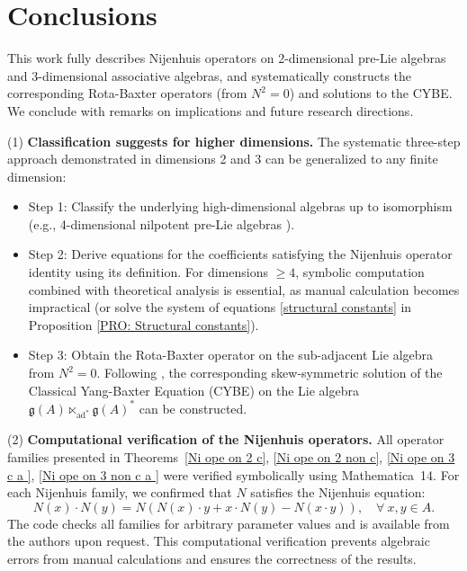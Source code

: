 \documentclass[12pt, reqno]{amsart}
\theoremstyle{plain}
\begin{document}
\section{Conclusions}
This work fully describes Nijenhuis operators on 2-dimensional pre-Lie algebras and 3-dimensional associative algebras, and systematically constructs the corresponding Rota-Baxter operators (from  $N^2=0$) and solutions to the CYBE. We conclude with remarks on implications and future research directions.

(1) \textbf{Classification suggests for higher dimensions.}
The systematic three-step approach demonstrated in dimensions 2 and 3 can be generalized to any finite dimension:  
\begin{itemize}  
  \item Step 1: Classify the underlying high-dimensional algebras up to isomorphism (e.g., 4-dimensional nilpotent pre-Lie algebras \cite{Adashev}).  
  \item Step 2: Derive equations for the coefficients satisfying the Nijenhuis operator identity using its definition. For dimensions $\geq 4$, symbolic computation combined with theoretical analysis is essential, as manual calculation becomes impractical (or solve the system of equations \eqref{structural constants} in Proposition \ref{PRO: Structural constants}).  
  \item Step 3: Obtain the Rota-Baxter operator on the sub-adjacent Lie algebra from $N^2 = 0$. Following \cite[Section 2]{Bai}, the corresponding skew-symmetric solution of the Classical Yang-Baxter Equation (CYBE) on the Lie algebra $\mathfrak{g}(A) \ltimes_{\mathrm{ad}^*} \mathfrak{g}(A)^*$ can be constructed.  
\end{itemize}


(2) \textbf{Computational verification of the Nijenhuis operators.}
All operator families presented in Theorems~\ref{Ni ope on 2 c}, \ref{Ni ope on 2 non c}, 
\ref{Ni ope on 3 c a }, \ref{Ni ope on 3 non c a }  were verified symbolically using \textsf{Mathematica}~14. For each Nijenhuis family, we confirmed that $N$ satisfies the Nijenhuis equation:  
\begin{equation*}
N(x) \cdot N(y) = N(N(x) \cdot y + x \cdot N(y) - N(x \cdot y)), \quad \forall~x, y \in A.
\end{equation*}  
The code checks all families for arbitrary parameter values and is available from the authors upon request. This computational verification prevents algebraic errors from manual calculations and ensures the correctness of the results.
\end{document}
